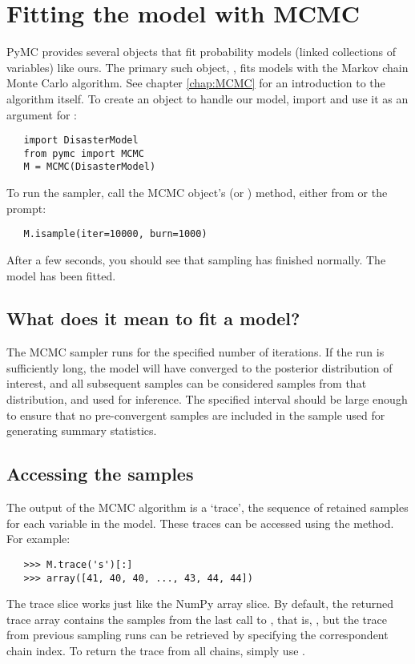 \section*{Fitting the model with MCMC}

PyMC provides several objects that fit probability models (linked collections of variables) like ours. The primary such object, , fits models with the Markov chain Monte Carlo algorithm. See chapter \ref{chap:MCMC} for an introduction to the algorithm itself. To create an  object to handle our model, import  and use it as an argument for :
\begin{verbatim}
   import DisasterModel
   from pymc import MCMC
   M = MCMC(DisasterModel)
\end{verbatim}
To run the sampler, call the MCMC object's  (or ) method, either from  or the prompt:
\begin{verbatim}
   M.isample(iter=10000, burn=1000)
\end{verbatim}
After a few seconds, you should see that sampling has finished normally. The model has been fitted.

\subsection*{What does it mean to fit a model?}

The MCMC sampler runs for the specified number of iterations. If the run is sufficiently long, the model will have converged to the posterior distribution of interest, and all subsequent samples can be considered samples from that distribution, and used for inference. The specified  interval should be large enough to ensure that no pre-convergent samples are included in the sample used for generating summary statistics.

\subsection*{Accessing the samples}
The output of the MCMC algorithm is a `trace', the sequence of retained
samples for each variable in the model. These traces can be accessed
using the  method. For example:
\begin{verbatim}
   >>> M.trace('s')[:]
   >>> array([41, 40, 40, ..., 43, 44, 44])
\end{verbatim}
The trace slice  works just like the NumPy array
slice. By default, the returned trace array contains the samples from the
last call to , that is, , but the trace from
previous sampling runs can be retrieved by specifying the correspondent 
chain index. To return the trace from all chains, simply use
. 


